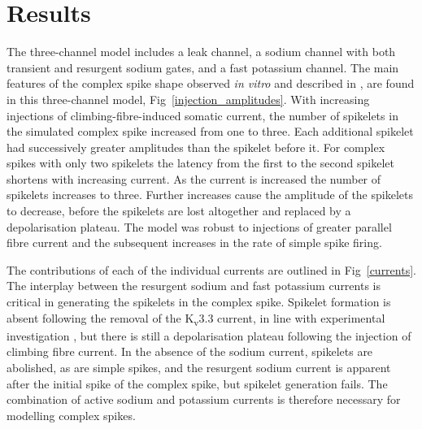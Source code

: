 \documentclass[utf8]{frontiersSCNS} %
\begin{document}
\section{Results}

The three-channel model includes a leak channel, a sodium channel with
both transient and resurgent sodium gates, and a fast potassium
channel. The main features of the complex spike shape observed
\textsl{in vitro} and described in \cite{DavieEtAl2008}, are found in
this three-channel model, Fig~\ref{injection_amplitudes}. With
increasing injections of climbing-fibre-induced somatic current, the
number of spikelets in the simulated complex spike increased from one
to three. Each additional spikelet had successively greater amplitudes
than the spikelet before it. For complex spikes with only two
spikelets the latency from the first to the second spikelet shortens
with increasing current. As the current is increased the number of
spikelets increases to three. Further increases cause the amplitude of
the spikelets to decrease, before the spikelets are lost altogether
and replaced by a depolarisation plateau. The model was robust to
injections of greater parallel fibre current and the subsequent
increases in the rate of simple spike firing.



The contributions of each of the individual currents are outlined in
Fig~\ref{currents}.  The interplay between the resurgent sodium and
fast potassium currents is critical in generating the spikelets in the
complex spike. Spikelet formation is absent following the removal of
the K\textsubscript{v}3.3 current, in line with experimental
investigation \cite{ZaghaEtAl2010}, but there is still a
depolarisation plateau following the injection of climbing fibre
current. In the absence of the sodium current, spikelets are
abolished, as are simple spikes, and the resurgent sodium current is
apparent after the initial spike of the complex spike, but spikelet
generation fails. The combination of active sodium and potassium
currents is therefore necessary for modelling complex spikes.
\end{document}
